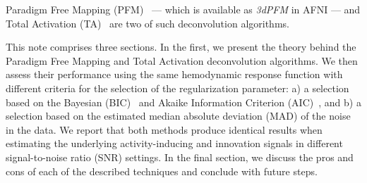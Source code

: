 Paradigm Free Mapping (PFM)~\cite{gaudes2013paradigm} --- which is available as \textit{3dPFM} in AFNI --- and Total Activation (TA)~\cite{karahanouglu2013total} are two of such deconvolution algorithms.

This note comprises three sections. In the first, we present the theory behind the Paradigm Free Mapping and Total Activation deconvolution algorithms. We then assess their performance using the same hemodynamic response function with different criteria for the selection of the regularization parameter: a) a selection based on the Bayesian (BIC)~\cite{schwarz1978estimating} and Akaike Information Criterion (AIC)~\cite{akaike1998information}, and b) a selection based on the estimated median absolute deviation (MAD) of the noise in the data. We report that both methods produce identical results when estimating the underlying activity-inducing and innovation signals in different signal-to-noise ratio (SNR) settings. In the final section, we discuss the pros and cons of each of the described techniques and conclude with future steps.
